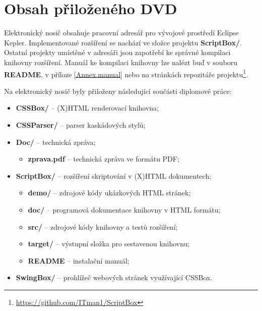 
\chapter{Obsah přiloženého DVD}
\label{Annex.dvdContent}


Elektronický nosič obsahuje pracovní adresář pro vývojové prostředí Eclipse Kepler. Implementované rozšíření se nachází ve složce projektu \textbf{ScriptBox/}. Ostatní projekty umístěné v adresáři jsou zapotřebí ke správné kompilaci knihovny rozšíření. Manuál ke kompilaci knihovny lze nalézt buď v souboru \textbf{README}, v příloze \ref{Annex.manual} nebo na stránkách repozitáře projektu\footnote{\url{https://github.com/ITman1/ScriptBox}}.

\medskip

\noindent Na elektronický nosič byly přiloženy následující součásti diplomové práce: 
\bigskip

\begin{itemize}
  \item \textbf{CSSBox/} -- (X)HTML renderovací knihovna;
  \item \textbf{CSSParser/} -- parser kaskádových stylů;
  \item \textbf{Doc/} -- technická zpráva;
    \begin{itemize}
      \item \textbf{zprava.pdf} -- technická zpráva ve formátu PDF;
    \end{itemize}
  \item \textbf{ScriptBox/} -- rozšíření skriptování v (X)HTML dokumentech;
    \begin{itemize}
      \item \textbf{demo/} -- zdrojové kódy ukázkových HTML stránek;
      \item \textbf{doc/} -- programová dokumentace knihovny v HTML formátu;
      \item \textbf{src/} -- zdrojové kódy knihovny a testů rozšíření;
      \item \textbf{target/} -- výstupní složka pro sestavenou knihovnu;
      \item \textbf{README} -- instalační manuál;
    \end{itemize}
  \item \textbf{SwingBox/} -- prohlížeč webových stránek využívající CSSBox.
\end{itemize}

